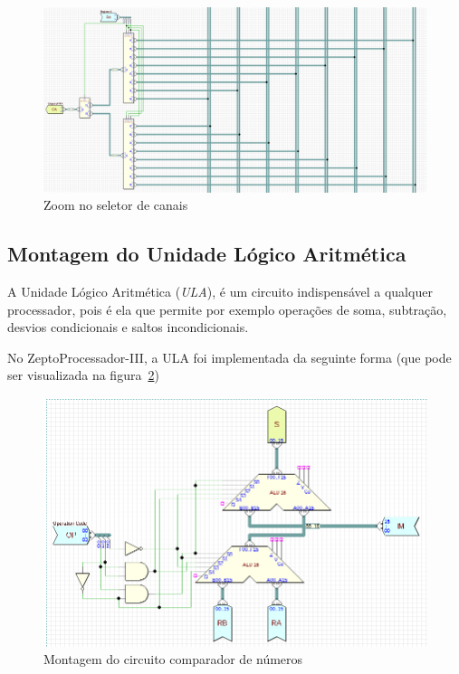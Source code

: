 \documentclass[12pt]{article}
\begin{document}
\begin{figure}[H]
    \centering
    \includegraphics[width=.9\textwidth]{Projeto/images/circuit__register_file_2.png}
    \caption{Zoom no seletor de canais}\label{fig:circuit__register_file_2.png}
\end{figure}


\subsection{Montagem do Unidade Lógico Aritmética}\label{sec:2.4}

A Unidade Lógico Aritmética (\emph{ULA}), é um circuito indispensável a qualquer
processador, pois é ela que permite por exemplo operações de soma, subtração,
desvios condicionais e saltos incondicionais.

No ZeptoProcessador-III, a ULA foi implementada da seguinte forma (que pode ser
visualizada na figura~\ref{fig:circuit__ula.png})

\begin{figure}[H]
    \centering
    \includegraphics[width=.9\textwidth]{Projeto/images/circuit__ula.png}
    \caption{Montagem do circuito comparador de números}\label{fig:circuit__ula.png}
\end{figure}
\end{document}
